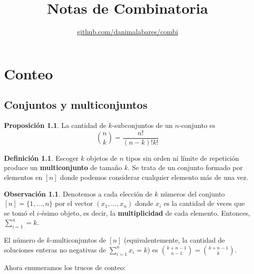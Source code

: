 \documentclass[spanish]{book}
\title{Notas de Combinatoria}
\author{
\href{https://github.com/danimalabares/combi}{github.com/danimalabares/combi}}
\renewcommand{\contentsname}{Índice}
\theoremstyle{definition}
\newtheorem*{defn}{Definición}
\newtheorem*{obs}{Observación}
\newtheorem*{prop}{Proposición}
\begin{document}
	\maketitle
	\addcontentsline{toc}{part}{\contentsname}
	\tableofcontents
	
\part{Conteo}
\chapter{Conjuntos y multiconjuntos}\label{chap:set-multiset}
	\begin{prop}
		La cantidad de $k$-subconjuntos de un $n$-conjunto es \[{n\choose k}=\frac{n!}{(n-k)!k!}\]
	\end{prop}
	\begin{defn}
		Escoger $k$ objetos de $n$ tipos sin orden ni límite de repetición produce un \textbf{multiconjunto} de tamaño $k$. Se trata de un conjunto formado por elementos en $[n]$ donde podemos considerar cualquier elemento más de una vez.
	\end{defn}
	\begin{obs}
		Denotemos a cada elección de $k$ números del conjunto $[n]=\{1,\ldots,n\}$ por el vector $(x_1,\ldots,x_n)$ donde $x_i$ es la cantidad de veces que se tomó el $i$-ésimo objeto, es decir, la \textbf{multiplicidad} de cada elemento. Entonces, $\sum_{i=1}^n=k$.
	\end{obs}
	\begin{teo}\label{thm:thm1}
		El número de $k$-multiconjuntos de $[n]$ (equivalentemente, la cantidad de soluciones enteras no negativas de $\sum_{i=1}^nx_i=k$) es ${k+n-1\choose n-1}={k+n-1\choose k}$.
	\end{teo}
	Ahora enumeramos los trucos de conteo:
\end{document}
